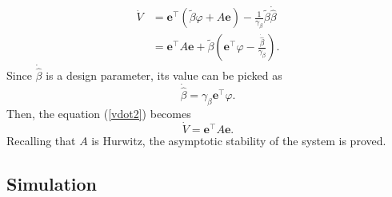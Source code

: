 \begin{align}
\dot{V}&=\mathbf{e}^\top(\tilde{\beta}\varphi+A\mathbf{e})-\frac{1}{\gamma_\beta}\tilde{\beta}\dot{\hat{\beta}}
\\&=\mathbf{e}^\top A\mathbf{e}+\tilde{\beta}(\mathbf{e}^\top\varphi-\frac{\dot{\hat{\beta}}}{\gamma_\beta}).
\end{align}
Since $\dot{\hat{\beta}}$ is a design parameter, its value can be picked as 
\begin{equation}
\dot{\hat{\beta}}=\gamma_\beta\mathbf{e}^\top\varphi.
\end{equation}
Then, the equation (\ref{vdot2}) becomes
\begin{equation}
\dot{V}=\mathbf{e}^\top A\mathbf{e}.
\end{equation}
Recalling that $A$ is Hurwitz, the asymptotic stability of the system is proved.
\subsection{Simulation}
